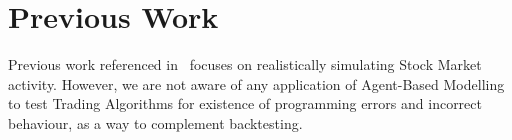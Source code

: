 \section{Previous Work}
Previous work referenced in~ focuses on realistically simulating Stock Market activity. However, we are not aware of any application of Agent-Based Modelling to test Trading Algorithms for existence of programming errors and incorrect behaviour, as a way to complement backtesting. 
